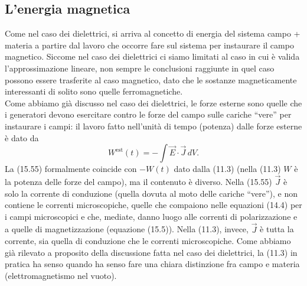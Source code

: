 \subsection{L'energia magnetica}

Come nel caso dei dielettrici, si arriva al concetto di energia del sistema
campo + materia a partire dal lavoro che occorre fare sul sistema per instaurare
il campo magnetico. Siccome nel caso dei dielettrici ci siamo limitati al caso
in cui \`e valida l'approssimazione lineare, non sempre le conclusioni raggiunte
in quel caso possono essere trasferite al caso magnetico, dato che le sostanze
magneticamente interessanti di solito sono quelle ferromagnetiche.\\
Come abbiamo gi\`a discusso nel caso dei dielettrici, le forze esterne sono
quelle che i generatori devono esercitare contro le forze del campo sulle
cariche ``vere'' per instaurare i campi: il lavoro fatto nell'unit\`a di tempo
(potenza) dalle forze esterne \`e dato da
\begin{equation}
  W^\mathrm{est}(t)=-\int\vec E\cdot\vec J\,dV.
  \tag{15.55}
\end{equation}
La (15.55) formalmente coincide con $-W(t)$ dato dalla (11.3) (nella (11.3) $W$
\`e la potenza delle forze del campo), ma il contenuto \`e diverso. Nella
(15.55) $\vec J$ \`e solo la corrente di conduzione (quella dovuta al moto delle
cariche ``vere''), e non contiene le correnti microscopiche, quelle che
compaiono nelle equazioni (14.4) per i campi microscopici e che, mediate, danno
luogo alle correnti di polarizzazione e a quelle di magnetizzazione
\big(equazione (15.5)\big). Nella (11.3), invece, $\vec J$ \`e tutta la
corrente, sia quella di conduzione che le correnti microscopiche. Come abbiamo
gi\`a rilevato a proposito della discussione fatta nel caso dei dielettrici, la
(11.3) in pratica ha senso quando ha senso fare una chiara distinzione fra campo
e materia (elettromagnetismo nel vuoto).

